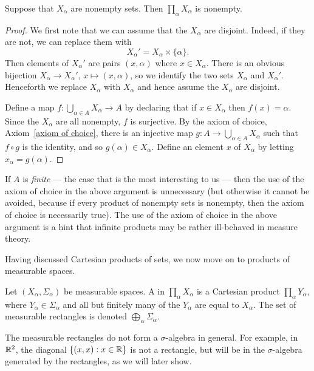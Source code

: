 \begin{lemma}
Suppose that $X_{\alpha}$ are nonempty sets. Then $\prod_{\alpha} X_{\alpha}$ is nonempty.
\end{lemma}
\begin{proof}
We first note that we can assume that the $X_{\alpha}$ are disjoint. Indeed, if they are not, we can replace them with
\[X_{\alpha}' = X_{\alpha} \times \{\alpha\}.\]
Then elements of $X_{\alpha}'$ are pairs $(x, \alpha)$ where $x \in X_{\alpha}$.
There is an obvious bijection $X_{\alpha} \to X_{\alpha}'$, $x \mapsto (x, \alpha)$, so we identify the two sets $X_{\alpha}$ and $X_{\alpha}'$.
Henceforth we replace $X_{\alpha}$ with $X_{\alpha}$ and hence assume the $X_{\alpha}$ are disjoint.

Define a map $f: \bigcup_{\alpha \in A} X_{\alpha} \to A$ by declaring that if $x \in X_{\alpha}$ then $f(x) = \alpha$.
Since the $X_{\alpha}$ are all nonempty, $f$ is surjective.
By the axiom of choice, Axiom~\ref{axiom of choice}, there is an injective map $g: A \to \bigcup_{\alpha \in A} X_{\alpha}$ such that $f \circ g$ is the identity, and so $g(\alpha) \in X_{\alpha}$.
Define an element $x$ of $X_{\alpha}$ by letting $x_{\alpha} = g(\alpha)$.
\end{proof}
If $A$ is \emph{finite} --- the case that is the most interesting to us --- then the use of the axiom of choice in the above argument is unnecessary (but otherwise it cannot be avoided, because if every product of nonempty sets is nonempty, then the axiom of choice is necessarily true).
The use of the axiom of choice in the above argument is a hint that infinite products may be rather ill-behaved in measure theory.

Having discussed Cartesian products of sets, we now move on to products of measurable spaces.
\begin{definition}
Let $(X_{\alpha}, \Sigma_{\alpha})$ be measurable spaces.
A  in $\prod_{\alpha} X_{\alpha}$ is a Cartesian product $\prod_{\alpha} Y_{\alpha}$, where $Y_{\alpha} \in \Sigma_{\alpha}$ and all but finitely many of the $Y_{\alpha}$ are equal to $X_{\alpha}$.
The set of measurable rectangles is denoted $\bigoplus_{\alpha} \Sigma_{\alpha}$.
\end{definition}

The measurable rectangles do not form a $\sigma$-algebra in general.
For example, in $\mathbb{R}^{2}$, the diagonal $\{(x, x): x \in \mathbb{R}\}$ is not a rectangle, but will be in the $\sigma$-algebra generated by the rectangles, as we will later show.

